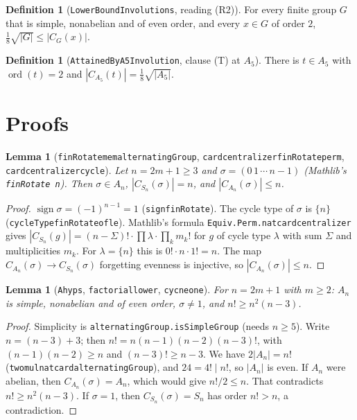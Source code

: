 \documentclass[11pt]{article}
\newtheorem{lemma}[theorem]{Lemma}
\theoremstyle{definition}
\newtheorem{definition}[theorem]{Definition}
\theoremstyle{remark}
\renewcommand{\_}{\oldus\allowbreak}
\begin{document}
\begin{definition}[\texttt{LowerBoundInvolutions}, reading (R2)]
For every finite group $G$ that is simple, nonabelian and of even order, and every $x\in G$ of order $2$,
$\tfrac18\sqrt{|G|}\le |C_G(x)|$.
\end{definition}

\begin{definition}[\texttt{AttainedByA5Involution}, clause (T) at $A_5$]
There is $t\in A_5$ with $\operatorname{ord}(t)=2$ and $|C_{A_5}(t)|=\tfrac18\sqrt{|A_5|}$.
\end{definition}

\section{Proofs}

\begin{lemma}[\texttt{finRotate\_mem\_alternatingGroup}, \texttt{card\_centralizer\_finRotate\_perm},
\texttt{card\_centralizer\_cyc\_le}]
Let $n=2m+1\ge 3$ and $\sigma=(0\,1\,\cdots\,n-1)$ (Mathlib's \texttt{finRotate n}). Then $\sigma\in A_n$,
$|C_{S_n}(\sigma)|=n$, and $|C_{A_n}(\sigma)|\le n$.
\end{lemma}
\begin{proof}
$\operatorname{sign}\sigma=(-1)^{n-1}=1$ (\texttt{sign\_finRotate}). The cycle type of $\sigma$ is $\{n\}$
(\texttt{cycleType\_finRotate\_of\_le}). Mathlib's formula \texttt{Equiv.Perm.nat\_card\_centralizer}
gives $|C_{S_n}(g)|=(n-\Sigma)!\cdot\prod\lambda\cdot\prod_k m_k!$ for $g$ of cycle type $\lambda$ with sum
$\Sigma$ and multiplicities $m_k$. For $\lambda=\{n\}$ this is $0!\cdot n\cdot 1!=n$. The map
$C_{A_n}(\sigma)\to C_{S_n}(\sigma)$ forgetting evenness is injective, so $|C_{A_n}(\sigma)|\le n$.
\end{proof}

\begin{lemma}[\texttt{A\_hyps}, \texttt{factorial\_lower}, \texttt{cyc\_ne\_one}]
For $n=2m+1$ with $m\ge 2$: $A_n$ is simple, nonabelian and of even order, $\sigma\ne1$, and
$n!\ge n^2(n-3)$.
\end{lemma}
\begin{proof}
Simplicity is \texttt{alternatingGroup.isSimpleGroup} (needs $n\ge5$). Write $n=(n-3)+3$; then
$n!=n(n-1)(n-2)(n-3)!$, with $(n-1)(n-2)\ge n$ and $(n-3)!\ge n-3$. We have $2|A_n|=n!$
(\texttt{two\_mul\_nat\_card\_alternatingGroup}), and $24=4!\mid n!$, so $|A_n|$ is even. If $A_n$ were
abelian, then $C_{A_n}(\sigma)=A_n$, which would give $n!/2\le n$. That contradicts $n!\ge n^2(n-3)$. If
$\sigma=1$, then $C_{S_n}(\sigma)=S_n$ has order $n!>n$, a contradiction.
\end{proof}
\end{document}
